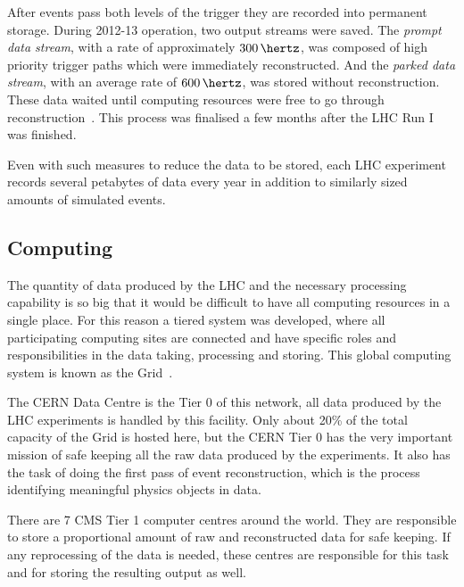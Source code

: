 After events pass both levels of the trigger they are recorded into permanent storage. During 2012-13 operation, two output streams were saved. The \textit{prompt data stream}, with a rate of approximately $300\,\hertz$, was composed of high priority trigger paths which were immediately reconstructed. And the \textit{parked data stream}, with an average rate of $600\,\hertz$, was stored without reconstruction. These data waited until computing resources were free to go through reconstruction~\cite{ARTICLE:CMSDataParking}. This process was finalised a few months after the \gls{LHC} Run I was finished.

Even with such measures to reduce the data to be stored, each \gls{LHC} experiment records several petabytes of data every year in addition to similarly sized amounts of simulated events.

\subsection{Computing}
\label{SUBSECTION:ExperimentalApparatus_CMS_Computing}


The quantity of data produced by the \gls{LHC} and the necessary processing capability is so big that it would be difficult to have all computing resources in a single place. For this reason a tiered system was developed, where all participating computing sites are connected and have specific roles and responsibilities in the data taking, processing and storing. This global computing system is known as the Grid~\cite{CMSTDR:CMSComputing}.

The \gls{CERN} Data Centre is the Tier 0 of this network, all data produced by the \gls{LHC} experiments is handled by this facility. Only about 20\% of the total capacity of the Grid is hosted here, but the \gls{CERN} Tier 0 has the very important mission of safe keeping all the raw data produced by the experiments. It also has the task of doing the first pass of event reconstruction, which is the process identifying meaningful physics objects in data.

There are 7 \gls{CMS} Tier 1 computer centres around the world. They are responsible to store a proportional amount of raw and reconstructed data for safe keeping. If any reprocessing of the data is needed, these centres are responsible for this task and for storing the resulting output as well. 

